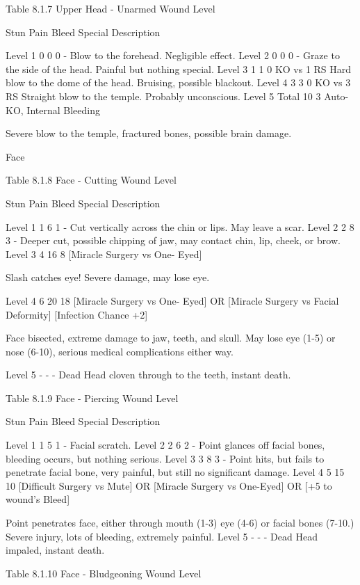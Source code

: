 \documentclass[oneside,11pt,english]{book}
\begin{document}
 
Table 8.1.7 Upper Head - Unarmed 
Wound 
Level 

Stun Pain Bleed Special Description 

Level 1 0 0 0 - Blow to the forehead. Negligible effect. 
Level 2 0 0 0 - Graze to the side of the head. Painful but nothing 
special. 
Level 3 1 1 0 KO vs 1 RS Hard blow to the dome of the head. Bruising, 
possible blackout. 
Level 4 3 3 0 KO vs 3 RS Straight blow to the temple. Probably unconscious. 
Level 5 Total 10 3 Auto-KO, Internal 
Bleeding 

Severe blow to the temple, fractured bones, possible 
brain damage. 


 

 

Face 

 
Table 8.1.8 Face - Cutting 
Wound 
Level 

Stun Pain Bleed Special Description 

Level 1 1 6 1 - Cut vertically across the chin or lips. May leave 
a scar. 
Level 2 2 8 3 - Deeper cut, possible chipping of jaw, may 
contact chin, lip, cheek, or brow. 
Level 3 4 16 8 [Miracle Surgery vs One-
Eyed] 

Slash catches eye! Severe damage, may lose 
eye. 

Level 4 6 20 18 [Miracle Surgery vs One-
Eyed] OR [Miracle Surgery 
vs Facial Deformity] 
[Infection Chance +2] 

Face bisected, extreme damage to jaw, teeth, 
and skull. May lose eye (1-5) or nose (6-10), 
serious medical complications either way. 

Level 5 - - - Dead Head cloven through to the teeth, instant death. 

 
Table 8.1.9 Face - Piercing 
Wound 
Level 

Stun Pain Bleed Special Description 

Level 1 1 5 1 - Facial scratch. 
Level 2 2 6 2 - Point glances off facial bones, bleeding 
occurs, but nothing serious. 
Level 3 3 8 3 - Point hits, but fails to penetrate facial bone, 
very painful, but still no significant damage. 
Level 4 5 15 10 [Difficult Surgery vs Mute] OR 
[Miracle Surgery vs One-Eyed] 
OR [+5 to wound’s Bleed] 

Point penetrates face, either through mouth 
(1-3) eye (4-6) or facial bones (7-10.) Severe 
injury, lots of bleeding, extremely painful. 
Level 5 - - - Dead Head impaled, instant death. 

 
Table 8.1.10 Face - Bludgeoning 
Wound 
Level 
\end{document}
